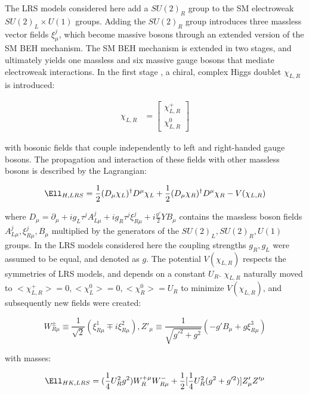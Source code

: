 The LRS models considered here add a $SU(2)_{R}$ group to the SM electroweak $SU(2)_{L} \times U(1)$ groups.
Adding the $SU(2)_{R}$ group introduces three massless vector fields $\xi^{j}_{\mu}$, which become massive 
bosons through an extended version of the SM BEH mechanism.  The SM BEH mechanism is extended in two stages, 
and ultimately yields one massless and six massive gauge bosons that mediate electroweak interactions.  In 
the first stage \cite{lrsHiggsStageOne}, a chiral, complex Higgs doublet $\chi_{L,R}$ is introduced: 

\begin{align}
	\chi_{L,R} &= \begin{bmatrix}
	\chi^{+}_{L,R} \\
	\chi^{0}_{L,R}
	\end{bmatrix}
	\label{eq:stageOneVEV}
\end{align}

with bosonic fields that couple independently to left and right-handed gauge bosons.  The propagation and 
interaction of these fields with other massless bosons is described by the Lagrangian:

\begin{equation}
	\Ell_{H,LRS} = \frac{1}{2}(D_{\mu}\chi_{L})^{\dagger}D^{\mu}\chi_{L} + \frac{1}{2}(D_{\mu}\chi_{R})^{\dagger}D^{\mu}\chi_{R} - V(\chi_{L,R})
\end{equation}

where $D_{\mu} = \partial_{\mu} + ig_{L}\tau^{j}A^{j}_{L\mu} + ig_{R}\tau^{j}\xi^{j}_{R\mu} + i\frac{g'}{2}YB_{\mu}$ contains 
the massless boson fields $A^{j}_{L\mu}, \xi^{j}_{R\mu}, B_{\mu}$ multiplied by the generators of the $SU(2)_{L}, SU(2)_{R}, U(1)$ groups.  
In the LRS models considered here the coupling strengths $g_{R}, g_{L}$ were assumed to be equal, and denoted as $g$.  
The potential $V(\chi_{L,R})$ respects the symmetries of LRS models, and depends on a constant $U_{R}$.  $\chi_{L,R}$ 
naturally moved to $<\chi^{+}_{L,R}> = 0, <\chi^{0}_{L}> = 0, <\chi^{0}_{R}> = U_{R}$ to minimize $V(\chi_{L,R})$, 
and subsequently new fields were created:

\begin{equation}
	W^{\pm}_{R\mu} \equiv \frac{1}{\sqrt{2}}(\xi^{1}_{R\mu} \mp i\xi^{2}_{R\mu}), 
	Z'_{\mu} \equiv \frac{1}{\sqrt{g'^{2} + g^{2}}}(-g'B_{\mu} + g\xi^{3}_{R\mu})
\end{equation}

with masses:

\begin{equation}
	\Ell_{HK,LRS} = (\frac{1}{4}U^{2}_{R}g^{2})W^{+\mu}_{R}W^{-}_{R\mu} + \frac{1}{2}[\frac{1}{4}U^{2}_{R}(g^{2} + g'^{2})]Z'_{\mu}Z'^{\mu}
\end{equation}

